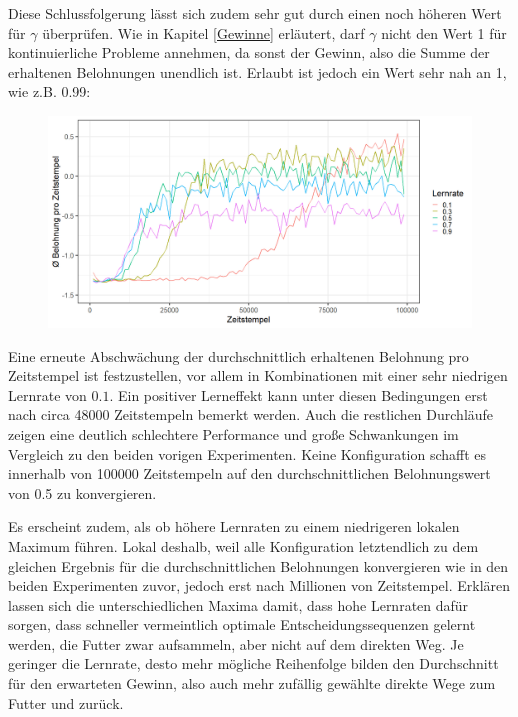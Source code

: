 \par 
Diese Schlussfolgerung lässt sich zudem sehr gut durch einen noch höheren Wert für $\gamma$ überprüfen. Wie in Kapitel \ref{Gewinne} erläutert, darf $\gamma$ nicht den Wert 1 für kontinuierliche Probleme annehmen, da sonst der Gewinn, also die Summe der erhaltenen Belohnungen unendlich ist. Erlaubt ist jedoch ein Wert sehr nah an 1, wie z.B. 0.99:
\begin{figure}[H]
    \centering
    \includegraphics[width=\textwidth]{images/antGameAnalysis099DiscA}
    \label{fig:test1}
\end{figure}
Eine erneute Abschwächung der durchschnittlich erhaltenen Belohnung pro Zeitstempel ist festzustellen, vor allem in Kombinationen mit einer sehr niedrigen Lernrate von $0.1$. Ein positiver Lerneffekt kann unter diesen Bedingungen erst nach circa 48000 Zeitstempeln bemerkt werden. Auch die restlichen Durchläufe zeigen eine deutlich schlechtere Performance und große Schwankungen im Vergleich zu den beiden vorigen Experimenten. Keine Konfiguration schafft es innerhalb von 100000 Zeitstempeln auf den durchschnittlichen Belohnungswert von 0.5 zu konvergieren. 
\par 
Es erscheint zudem, als ob höhere Lernraten zu einem niedrigeren lokalen Maximum führen. Lokal deshalb, weil alle Konfiguration letztendlich zu dem gleichen Ergebnis für die durchschnittlichen Belohnungen konvergieren wie in den beiden Experimenten zuvor, jedoch erst nach Millionen von Zeitstempel. Erklären lassen sich die unterschiedlichen Maxima damit, dass hohe Lernraten dafür sorgen, dass schneller vermeintlich optimale Entscheidungssequenzen gelernt werden, die Futter zwar aufsammeln, aber nicht auf dem direkten Weg. Je geringer die Lernrate, desto mehr mögliche Reihenfolge bilden den Durchschnitt für den erwarteten Gewinn, also auch mehr zufällig gewählte direkte Wege zum Futter und zurück.

